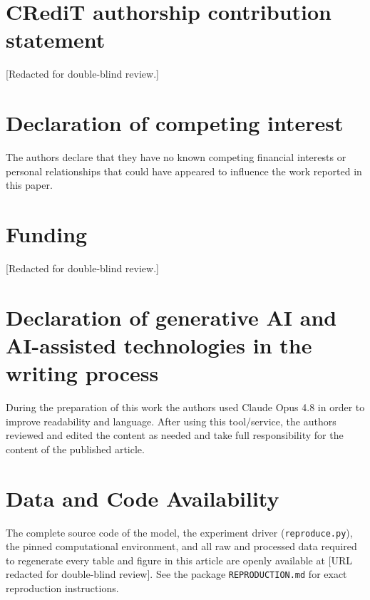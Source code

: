 \documentclass[a4paper,fleqn]{cas-sc}
\begin{document}
\section*{CRediT authorship contribution statement}
[Redacted for double-blind review.]

\section*{Declaration of competing interest}
The authors declare that they have no known competing financial interests or
personal relationships that could have appeared to influence the work reported
in this paper.

\section*{Funding}
[Redacted for double-blind review.]

\section*{Declaration of generative AI and AI-assisted technologies in the writing process}
During the preparation of this work the authors used Claude Opus 4.8 in order
to improve readability and language. After using this tool/service, the authors
reviewed and edited the content as needed and take full responsibility for the
content of the published article.

\section*{Data and Code Availability}
\label{sec:availability}
The complete source code of the model, the experiment driver (\texttt{reproduce.py}), the pinned computational environment, and all raw and processed data required to regenerate every table and figure in this article are openly available at [URL redacted for double-blind review]. See the package \texttt{REPRODUCTION.md} for exact reproduction instructions.



\end{document}

